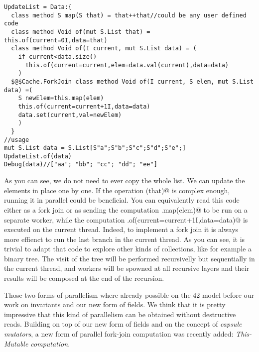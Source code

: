 \begin{lstlisting}
UpdateList = Data:{
  class method S map(S that) = that++that//could be any user defined code
  class method Void of(mut S.List that) = this.of(current=0I,data=that)  
  class method Void of(I current, mut S.List data) = (
    if current<data.size() 
      this.of(current=current,elem=data.val(current),data=data)
    )
  $@$Cache.ForkJoin class method Void of(I current, S elem, mut S.List data) =(
    S newElem=this.map(elem)
    this.of(current=current+1I,data=data)
    data.set(current,val=newElem)
    )
  }
//usage
mut S.List data = S.List[S"a";S"b";S"c";S"d";S"e";]
UpdateList.of(data)
Debug(data)//["aa"; "bb"; "cc"; "dd"; "ee"]
\end{lstlisting}
As you can see, we do not need to ever copy the whole list. We can update the elements in place one by one.
If the operation \Q@map(that)@ is complex enough, running it in parallel could be beneficial.
You can equivalently read this code either as a fork join or as sending the computation \Q@this.map(elem)@ to be run on a separate worker, while
the computation     \Q@this.of(current=current+1I,data=data)@ is executed on the current thread.
Indeed, to implement a fork join it is always more effienct to run the last branch in the current thread.
As you can see, it is trivial to adapt that code to explore other kinds of collections, like for example a binary tree.
The visit of the tree will be performed recursivelly but sequentially in the current thread, and workers will be spowned at all recursive layers and their results will be composed at the end of the recursion.


Those two forms of parallelism where already possible on the 42 model before our work on invariants and our new form of \Q@capsule@ fields.
We think that it is pretty impressive that this kind of parallelism can be obtained without destructive reads.
Building on top of our new form of \Q@capsule@ fields and on the concept of \emph{capsule mutators}, a new form of parallel fork-join computation was recently added:
\emph{This-Mutable computation}.


